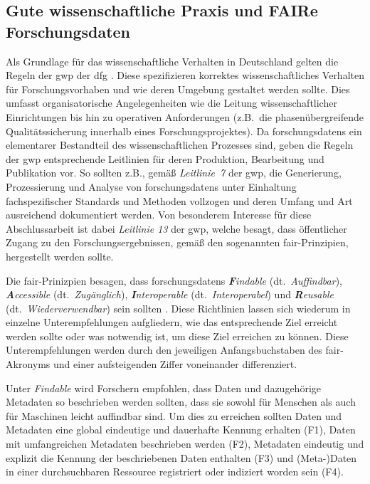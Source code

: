 \subsection{Gute wissenschaftliche Praxis und
FAIRe Forschungsdaten}\label{sec:forschungsstand-basics-gwp-fair}
Als Grundlage für das wissenschaftliche Verhalten in Deutschland gelten die Regeln der \gls{gwp} der \gls{dfg} \autocite{dfg-gwp}.
Diese spezifizieren korrektes wissenschaftliches Verhalten für Forschungsvorhaben und wie deren Umgebung gestaltet werden sollte.
Dies umfasst organisatorische Angelegenheiten wie die Leitung wissenschaftlicher Einrichtungen bis hin zu operativen Anforderungen (z.B.~die phasenübergreifende Qualitätssicherung innerhalb eines Forschungsprojektes).
Da \glspl{forschungsdaten} ein elementarer Bestandteil des wissenschaftlichen Prozesses sind, geben die Regeln der \gls{gwp} entsprechende Leitlinien für deren Produktion, Bearbeitung und Publikation vor.
So sollten z.B., gemäß \textit{Leitlinie~7} der \gls{gwp}, die Generierung, Prozessierung und Analyse von \glspl{forschungsdaten} unter Einhaltung fachspezifischer Standards und Methoden vollzogen und deren Umfang und Art ausreichend dokumentiert werden.
Von besonderem Interesse für diese Abschlussarbeit ist dabei \textit{Leitlinie 13} der \gls{gwp}, welche besagt, dass öffentlicher Zugang zu den Forschungsergebnissen, gemäß den sogenannten \gls{fair}-Prinzipien, hergestellt werden sollte.

Die \gls{fair}-Prinizpien besagen, dass \glspl{forschungsdaten} \textit{\textbf{F}indable} (dt.~\textit{Auffindbar}), \textit{\textbf{A}ccessible} (dt.~\textit{Zugänglich}), \textit{\textbf{I}nteroperable} (dt.~\textit{Interoperabel}) und \textit {\textbf{R}eusable} (dt.~\textit{Wiederverwendbar}) sein sollten \autocite{Wilkinson2016}.
Diese Richtlinien lassen sich wiederum in einzelne Unterempfehlungen aufgliedern, wie das entsprechende Ziel erreicht werden sollte oder was notwendig ist, um diese Ziel erreichen zu können.
Diese Unterempfehlungen werden durch den jeweiligen Anfangsbuchstaben des \gls{fair}-Akronyms und einer aufsteigenden Ziffer voneinander differenziert.

Unter \textit{Findable} wird Forschern empfohlen, dass Daten und dazugehörige Metadaten so beschrieben werden sollten, dass sie sowohl für Menschen als auch für Maschinen leicht auffindbar sind.
Um dies zu erreichen sollten Daten und Metadaten eine global eindeutige und dauerhafte Kennung erhalten (F1), Daten mit umfangreichen Metadaten beschrieben werden (F2), Metadaten eindeutig und explizit die Kennung der beschriebenen Daten enthalten (F3) und (Meta-)Daten in einer durchsuchbaren Ressource registriert oder indiziert worden sein (F4).

